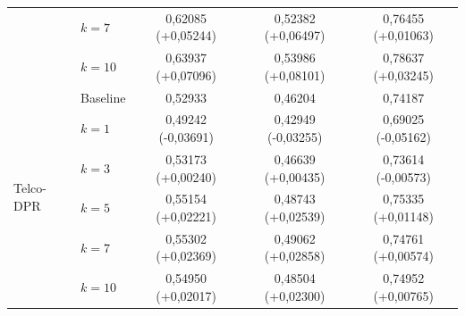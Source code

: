 \begin{table}[htbp]
{\begin{tabular}{llccc}
 & $k=7$ & 0,62085 (+0,05244) & 0,52382 (+0,06497) & 0,76455 (+0,01063) \\
 & $k=10$ & 0,63937 (+0,07096) & 0,53986 (+0,08101) & 0,78637 (+0,03245) \\
\hline
\multirow{6}{*}{Telco-DPR} & Baseline & 0,52933 & 0,46204 & 0,74187 \\
 & $k=1$ & 0,49242 (-0,03691) & 0,42949 (-0,03255) & 0,69025 (-0,05162) \\
 & $k=3$ & 0,53173 (+0,00240) & 0,46639 (+0,00435) & 0,73614 (-0,00573) \\
 & $k=5$ & 0,55154 (+0,02221) & 0,48743 (+0,02539) & 0,75335 (+0,01148) \\
 & $k=7$ & 0,55302 (+0,02369) & 0,49062 (+0,02858) & 0,74761 (+0,00574) \\
 & $k=10$ & 0,54950 (+0,02017) & 0,48504 (+0,02300) & 0,74952 (+0,00765) \\
\hline
\end{tabular}
}
\end{table}


